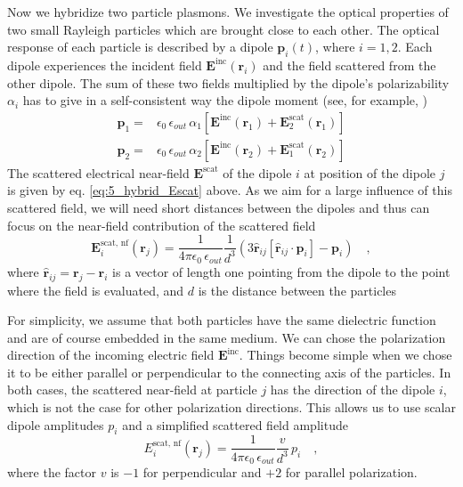 Now we hybridize two particle plasmons. We investigate the optical properties of two small Rayleigh particles which are brought close to each other.  The optical response of each particle is described by  a dipole $ \mathbf{p}_i(t)$, where $i = 1,2$.
 Each dipole experiences the incident field
$\mathbf{E}^{\text{inc}}(\mathbf{r}_i)$ and the field scattered from the other dipole.
The sum of these two fields multiplied by the dipole's polarizability $\alpha_i$
has to give in a self-consistent way the dipole moment (see, for example, \cite{Myroshnychenko08})
%
\begin{align} \label{eq:5_hbyrid_equationsystem}
     \mathbf{p}_1 = &  \epsilon_0 \,  \epsilon_{out} \,  \alpha_1 \left[ \mathbf{E}^{\text{inc}} (\mathbf{r}_1) +
\mathbf{E}^{\text{scat}}_2(\mathbf{r}_1) \right] \\
  \mathbf{p}_2 = &  \epsilon_0 \,  \epsilon_{out} \,  \alpha_2 \left[ \mathbf{E}^{\text{inc}} (\mathbf{r}_2) +
\mathbf{E}^{\text{scat}}_1(\mathbf{r}_2) \right]  \nonumber
\end{align}
%
The scattered electrical near-field $ \mathbf{E}^{\text{scat}}$ of the dipole $i$ at position of the dipole $j$ is given by eq.   \ref{eq:5_hybrid_Escat} above. As we aim  for a large influence of this scattered field, we will need short distances between the dipoles and thus can focus on the near-field contribution of the scattered field
\begin{equation}
  \mathbf{E}^{\text{scat, nf}}_i(\mathbf{r}_j) = \frac{ 1 }{4\pi\epsilon_0 \, \epsilon_{out}}  \frac{1}{d^3}
        \left( 3\hat{\mathbf{r}}_{ij} \left[\hat{\mathbf{r}}_{ij} \cdot \mathbf{p}_i \right] - \mathbf{p}_i \right)
  \quad ,
\end{equation}
where $\hat{\mathbf{r}}_{ij}   = \mathbf{r} _j - \mathbf{r} _i$ is a vector of length one pointing from the dipole to the point where
the field is evaluated, and $d$ is the distance between the particles


For simplicity, we assume that both particles have the same dielectric function and are of course embedded in the same medium. 
We  can chose the polarization direction of the incoming electric field  $\mathbf{E}^{\text{inc}}$. Things become simple when we chose it to be either parallel or perpendicular to the connecting axis of the particles. In both cases, the scattered near-field at particle $j$ has the direction of the dipole $i$, which is not the case for other polarization directions. This allows us to use scalar dipole amplitudes $p_i$ and a simplified scattered field amplitude
\begin{equation}
  {E}^{\text{scat, nf}}_i(\mathbf{r}_j) = \frac{ 1 }{4\pi\epsilon_0 \, \epsilon_{out}}  \frac{v}{d^3} \, p_i 
  \quad ,
\end{equation}
where the factor $v$ is $-1$ for perpendicular and $+2$ for parallel polarization.

